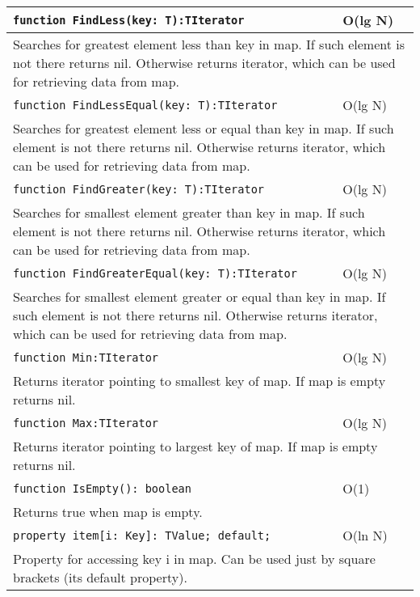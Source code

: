 \begin{longtable}{|m{10cm}|m{5cm}|}
\verb!function FindLess(key: T):TIterator! & O(lg N) \\\hline
\multicolumn{2}{|m{15cm}|}{Searches for greatest element less than key in map. If such element is not there returns nil. Otherwise
returns iterator, which can be used for retrieving data from map.} \\\hline\hline

\verb!function FindLessEqual(key: T):TIterator! & O(lg N) \\\hline
\multicolumn{2}{|m{15cm}|}{Searches for greatest element less or equal than key in map. If such element is not there returns nil. Otherwise
returns iterator, which can be used for retrieving data from map.} \\\hline\hline

\verb!function FindGreater(key: T):TIterator! & O(lg N) \\\hline
\multicolumn{2}{|m{15cm}|}{Searches for smallest element greater than key in map. If such element is not there returns nil. Otherwise
returns iterator, which can be used for retrieving data from map.} \\\hline\hline

\verb!function FindGreaterEqual(key: T):TIterator! & O(lg N) \\\hline
\multicolumn{2}{|m{15cm}|}{Searches for smallest element greater or equal than key in map. If such element is not there returns nil. Otherwise
returns iterator, which can be used for retrieving data from map.} \\\hline\hline

\verb!function Min:TIterator! & O(lg N) \\\hline
\multicolumn{2}{|m{15cm}|}{Returns iterator pointing to smallest key of map. If map is empty returns
nil.} \\\hline\hline

\verb!function Max:TIterator! & O(lg N) \\\hline
\multicolumn{2}{|m{15cm}|}{Returns iterator pointing to largest key of map. If map is empty returns
nil.} \\\hline\hline

\verb!function IsEmpty(): boolean! & O(1) \\ \hline
\multicolumn{2}{|m{15cm}|}{Returns true when map is empty.} \\\hline

\verb!property item[i: Key]: TValue; default;! & O(ln N) \\\hline
\multicolumn{2}{|m{15cm}|}{Property for accessing key i in map. Can be used just by square
brackets (its default property).} \\\hline\hline


\end{longtable}

